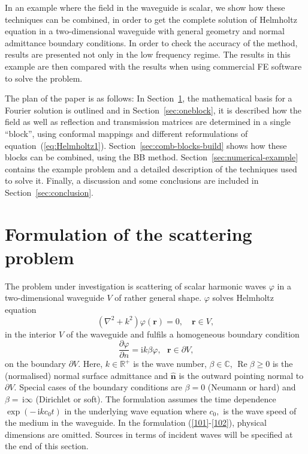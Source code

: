\documentclass{svjour3}
\renewcommand{\phi}{\varphi}
\renewcommand{\Re}{\operatorname{Re}}
\renewcommand{\i}{\,\mathrm{i}}
\newcommand{\R}{\mathbb R}
\begin{document}
In an example where the field in the waveguide is scalar, we show how
these techniques can be combined, in order to get the complete
solution of Helmholtz equation in a two-dimensional waveguide with
general geometry and normal admittance boundary conditions. In order
to check the accuracy of the method, results are presented not only in
the low frequency regime.  The results in this example are then
compared with the results when using commercial FE software to solve
the problem.

The plan of the paper is as follows: In Section~\ref{sec:prel}, the
mathematical basis for a Fourier solution is outlined and in
Section~\ref{sec:oneblock}, it is described how the field as well as
reflection and transmission matrices are determined in a single
``block'', using conformal mappings and different reformulations of
equation~(\ref{eq:Helmholtz1}).  Section~\ref{sec:comb-blocks-build}
shows how these blocks can be combined, using the BB
method. Section~\ref{sec:numerical-example} contains the example
problem and a detailed description of the techniques used to solve
it. Finally, a discussion and some conclusions are included in
Section~\ref{sec:conclusion}.


\section{Formulation of the scattering problem}
\label{sec:prel}


The problem under investigation is scattering of scalar harmonic waves
$\phi$ in a two-dimensional waveguide $V$ of rather general
shape. $\phi$ solves Helmholtz equation%
\begin{equation}
  (\nabla^{2}+k^{2})\phi(\bm{r})=0,\quad\bm{r}\in V, \label{101}%
\end{equation}
in the interior $V$ of the waveguide and fulfils a homogeneous
boundary condition%
\begin{equation}
  \dfrac{\partial \phi}{\partial n}=\text{i}k\beta \phi,
  \text{ }\bm{r}\in\partial V\text{,} \label{102}%
\end{equation}
on the boundary $\partial V$. Here, $k\in\R^{+}$ is the wave
number, $\beta\in\mathbb{C}$, $\Re\beta\geq0$ is the (normalised)
normal surface admittance and $\widehat{\bm{n}}$ is the outward
pointing normal to $\partial V$. Special cases of the boundary
conditions are $\beta=0$ (Neumann or hard) and $\beta=\i\infty$
(Dirichlet or soft). The formulation assumes the time dependence
$\exp(-\i kc_{0}t)$ in the underlying wave equation where $c_{0},$ is
the wave speed of the medium in the waveguide.  In the formulation
(\ref{101}-\ref{102}), physical dimensions are omitted.  Sources in
terms of incident waves will be specified at the end of this section.
\end{document}

